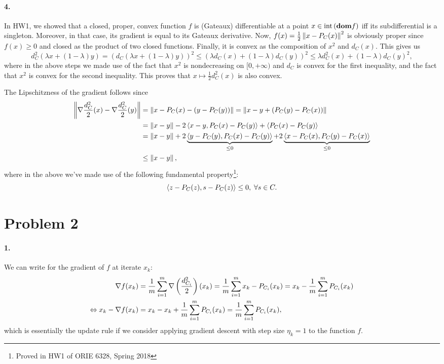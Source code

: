 \documentclass[10pt]{article}
\begin{document}
\paragraph{4.}
In HW1, we showed that a closed, proper, convex function $f$ is (Gateaux)
differentiable at a point $x \in \mathrm{int}\left( \textbf{dom} f \right)$ iff its
subdifferential is a singleton. Moreover, in that case, its gradient is equal
to its Gateaux derivative. Now, $f(x) = \frac{1}{2} \left \| x - P_C(x) \right \|^2$ is
obviously proper since $f(x) \geq 0$ and closed as the product of two closed
functions. Finally, it is convex as the composition of $x^2$ and $d_C(x)$.
This gives us
\[
    d^2_C(\lambda x + (1 - \lambda) y) =
    \left( d_C(\lambda x + (1 - \lambda) y) \right)^2 \leq
    \left( \lambda d_C(x) + (1 - \lambda) d_C(y) \right)^2 \leq
    \lambda d_C^2(x) + (1 - \lambda) d_C(y)^2,
\]
where in the above steps we made use of the fact that $x^2$ is nondecreasing on
$[0, +\infty)$ and $d_C$ is convex for the first inequality, and the fact that
$x^2$ is convex for the second inequality. This proves that $x \mapsto
\frac{1}{2}d_C^2(x)$ is also convex.

The Lipschitzness of the gradient follows since
\begin{align*}
    \left \| \nabla \frac{d_C^2}{2}(x) - \nabla \frac{d_C^2}{2}(y) \right \| &=
    \left \| x - P_C(x) - (y - P_C(y)) \right \| = \left \| x - y + (P_C(y) - P_C(x)) \right \| \\
    &= \left \| x - y \right \| - 2\left\langle x - y, P_C(x) - P_C(y) \right\rangle + \left\langle P_C(x) - P_C(y) \right\rangle \\
    &= \left \| x - y \right \| + 2 \underbrace{\left\langle y - P_C(y), P_C(x) - P_C(y) \right\rangle}_{\leq 0}
       + 2 \underbrace{\left\langle x - P_C(x), P_C(y) - P_C(x) \right\rangle}_{\leq 0} \\
    &\leq \left \| x - y \right \|,
\end{align*}
where in the above we've made use of the following fundamental
property\footnote{Proved in HW1 of ORIE 6328, Spring 2018}:
\[
    \left\langle z - P_C(z), s - P_C(z) \right\rangle \leq 0, \; \forall s \in C.
\]
\section*{Problem 2}
\paragraph{1.}
We can write for the gradient of $f$ at iterate $x_k$:
\begin{align*}
    \nabla f(x_k) &= \frac{1}{m} \sum_{i=1}^{m} \nabla \left(
    \frac{d^2_{C_i}}{2} \right)(x_k) = \frac{1}{m} \sum_{i=1}^m x_k -
    P_{C_i}(x_k) = x_k - \frac{1}{m} \sum_{i=1}^m P_{C_i}(x_k) \\
    \Leftrightarrow
    x_k - \nabla f(x_k) &= x_k - x_k + \frac{1}{m} \sum_{i=1}^m P_{C_i}(x_k)
        = \frac{1}{m} \sum_{i=1}^m P_{C_i}(x_k),
\end{align*}
which is essentially the update rule if we consider applying gradient descent
with step size $\eta_k = 1$ to the function $f$.
\end{document}
